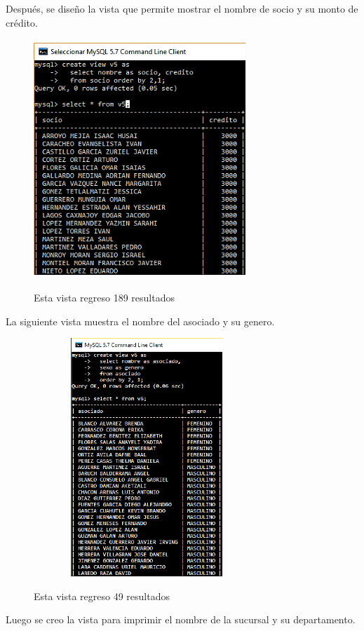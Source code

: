 \documentclass[12pt, titlepage]{article}
\begin{document}
	Después, se diseño la vista que permite mostrar el nombre de socio y su monto de crédito.
	\begin{figure}[H]
		\begin{center}
			\includegraphics[width=8cm, height=9cm]{img/v5.png}
			\label{fig:v5}
			\caption{Esta vista regreso 189 resultados}
		\end{center}
	\end{figure}
	La siguiente vista muestra el nombre del asociado y su genero.
		\begin{figure}[H]
		\begin{center}
			\includegraphics[width=8.5cm, height=9cm]{img/v6.png}
			\label{fig:v6}
			\caption{Esta vista regreso 49 resultados}
		\end{center}
	\end{figure}
	Luego se creo la vista para imprimir el nombre de la sucursal y su departamento.
\end{document}
